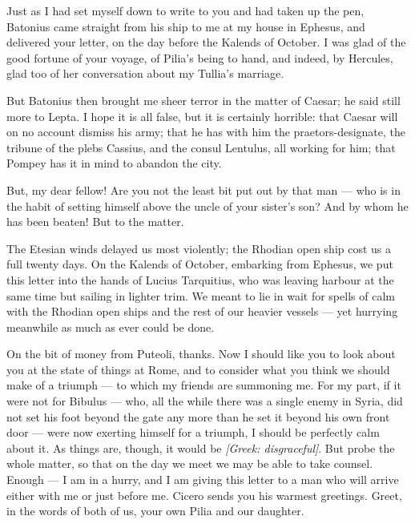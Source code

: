 

 Just as I had set myself down to write to you and had taken up the pen, Batonius came straight from his ship to me at my house in Ephesus, and delivered your letter, on the day before the Kalends of October. I was glad of the good fortune of your voyage, of Pilia's being to hand, and indeed, by Hercules, glad too of her conversation about my Tullia's marriage.

 But Batonius then brought me sheer terror in the matter of Caesar; he said still more to Lepta. I hope it is all false, but it is certainly horrible: that Caesar will on no account dismiss his army; that he has with him the praetors-designate, the tribune of the plebs Cassius, and the consul Lentulus, all working for him; that Pompey has it in mind to abandon the city.

 But, my dear fellow! Are you not the least bit put out by that man --- who is in the habit of setting himself above the uncle of your sister's son? And by whom he has been beaten! But to the matter.

 The Etesian winds delayed us most violently; the Rhodian open ship cost us a full twenty days. On the Kalends of October, embarking from Ephesus, we put this letter into the hands of Lucius Tarquitius, who was leaving harbour at the same time but sailing in lighter trim. We meant to lie in wait for spells of calm with the Rhodian open ships and the rest of our heavier vessels --- yet hurrying meanwhile as much as ever could be done.

 On the bit of money from Puteoli, thanks. Now I should like you to look about you at the state of things at Rome, and to consider what you think we should make of a triumph --- to which my friends are summoning me. For my part, if it were not for Bibulus --- who, all the while there was a single enemy in Syria, did not set his foot beyond the gate any more than he set it beyond his own front door --- were now exerting himself for a triumph, I should be perfectly calm about it. As things are, though, it would be \textit{[Greek: disgraceful]}. But probe the whole matter, so that on the day we meet we may be able to take counsel. Enough --- I am in a hurry, and I am giving this letter to a man who will arrive either with me or just before me. Cicero sends you his warmest greetings. Greet, in the words of both of us, your own Pilia and our daughter.
